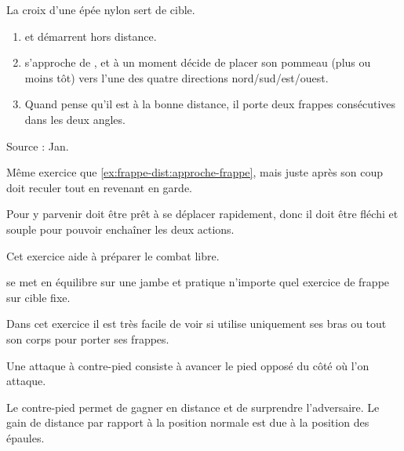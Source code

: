 \begin{exercice}
\label{ex:frappe-dist:approche-croix-aleat}

La croix d'une épée nylon sert de cible.

\begin{enumerate}
	\item \A et \D démarrent hors distance.
	\item \D s'approche de \A, et à un moment décide de placer son pommeau (plus ou moins tôt) vers l'une des quatre directions nord/sud/est/ouest.
	\item Quand \A pense qu'il est à la bonne distance, il porte deux frappes consécutives dans les deux angles.
\end{enumerate}

Source : Jan.

\end{exercice}


\begin{exercice}
\label{ex:frappe-dist:approche-croix-aleat-garde}

Même exercice que \ref{ex:frappe-dist:approche-frappe}, mais juste après son coup \A doit reculer tout en revenant en garde.

Pour y parvenir \A doit être prêt à se déplacer rapidement, donc il doit être fléchi et souple pour pouvoir enchaîner les deux actions.

Cet exercice aide à préparer le combat libre.

\end{exercice}


\begin{exercice}
\A se met en équilibre sur une jambe et pratique n'importe quel exercice de frappe sur cible fixe.

Dans cet exercice il est très facile de voir si \A utilise uniquement ses bras ou tout son corps pour porter ses frappes.
\end{exercice}


\begin{coup}
\label{struct:coup:contre-pied}

Une attaque à contre-pied consiste à avancer le pied opposé du côté où l'on attaque.
\end{coup}

Le contre-pied permet de gagner en distance et de surprendre l'adversaire.
Le gain de distance par rapport à la position normale est due à la position des épaules.


